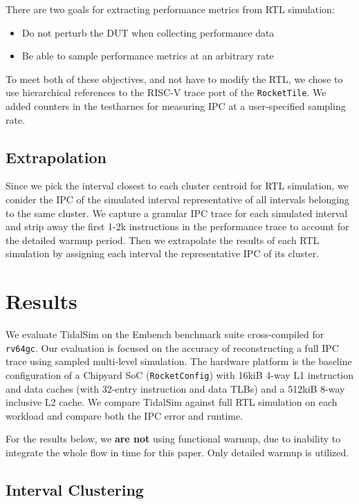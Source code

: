 \documentclass[sigplan,nonacm,10pt]{acmart}
\begin{document}
There are two goals for extracting performance metrics from RTL simulation:
\begin{itemize}
  \item Do not perturb the DUT when collecting performance data
  \item Be able to sample performance metrics at an arbitrary rate
\end{itemize}

To meet both of these objectives, and not have to modify the RTL, we chose to use hierarchical references to the RISC-V trace port of the \texttt{RocketTile}.
We added counters in the testharnes for measuring IPC at a user-specified sampling rate.

\subsection{Extrapolation}

Since we pick the interval closest to each cluster centroid for RTL simulation, we conider the IPC of the simulated interval representative of all intervals belonging to the same cluster.
We capture a granular IPC trace for each simulated interval and strip away the first 1-2k instructions in the performance trace to account for the detailed warmup period.
Then we extrapolate the results of each RTL simulation by assigning each interval the representative IPC of its cluster.

\section{Results}

We evaluate TidalSim on the Embench benchmark suite\cite{embench} cross-compiled for \texttt{rv64gc}.
Our evaluation is focused on the accuracy of reconstructing a full IPC trace using sampled multi-level simulation.
The hardware platform is the baseline configuration of a Chipyard SoC (\texttt{RocketConfig}) with 16kiB 4-way L1 instruction and data caches (with 32-entry instruction and data TLBs) and a 512kiB 8-way inclusive L2 cache.
We compare TidalSim against full RTL simulation on each workload and compare both the IPC error and runtime.

For the results below, we \textbf{are not} using functional warmup, due to inability to integrate the whole flow in time for this paper.
Only detailed warmup is utilized.

\subsection{Interval Clustering}
\end{document}
